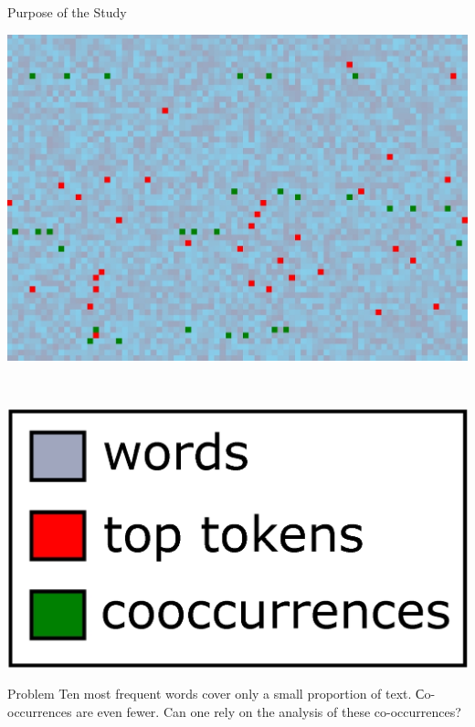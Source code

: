 \documentclass[russian]{beamer}
\begin{document}
\begin{frame}{Purpose of the Study}
  \begin{minipage}{0.70\textwidth}
    \includegraphics[width=\textwidth]{doc11358_topic0.jpg}
  \end{minipage}
  ~
  \begin{minipage}{0.25\textwidth}
    \includegraphics[width=\textwidth]{legend.eps}
  \end{minipage}
  \begin{block}{Problem}
    Ten most frequent words cover only a small proportion of text.
    Сo-occurrences are even fewer.
    Can one rely on the analysis of these co-occurrences?
  \end{block}
\end{frame}
\end{document}
